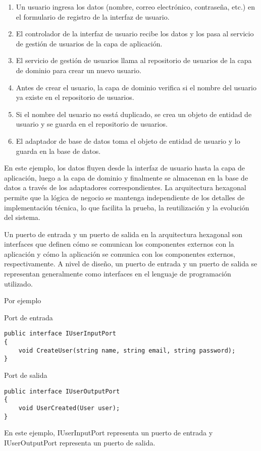 \documentclass[executivepaper]{article}
\begin{document}
\begin{enumerate}
    \item Un usuario ingresa los datos (nombre, correo electrónico, contraseña, etc.) en el formulario de registro de la interfaz de usuario.
    \item El controlador de la interfaz de usuario recibe los datos y los pasa al servicio de gestión de usuarios de la capa de aplicación.
    \item El servicio de gestión de usuarios llama al repositorio de usuarios de la capa de dominio para crear un nuevo usuario.
    \item Antes de crear el usuario, la capa de dominio verifica si el nombre del usuario ya existe en el repositorio de usuarios.
    \item Si el nombre del usuario no esstá duplicado, se crea un objeto de entidad de usuario y se guarda en el repositorio de usuarios.
    \item El adaptador de base de datos toma el objeto de entidad de usuario y lo guarda en la base de datos.
\end{enumerate}
En este ejemplo, los datos fluyen desde la interfaz de usuario hasta la capa de aplicación, luego a la capa de dominio y finalmente se almacenan en la base de datos a través de los adaptadores correspondientes. La arquitectura hexagonal permite que la lógica de negocio se mantenga independiente de los detalles de implementación técnica, lo que facilita la prueba, la reutilización y la evolución del sistema.

Un puerto de entrada y un puerto de salida en la arquitectura hexagonal son interfaces que definen cómo se comunican los componentes externos con la aplicación y cómo la aplicación se comunica con los componentes externos, respectivamente. A nivel de diseño, un puerto de entrada y un puerto de salida se representan generalmente como interfaces en el lenguaje de programación utilizado.

Por ejemplo 

Port de entrada
\begin{lstlisting}
public interface IUserInputPort
{
    void CreateUser(string name, string email, string password);
}
\end{lstlisting}

Port de salida
\begin{lstlisting}
public interface IUserOutputPort
{
    void UserCreated(User user);
}
\end{lstlisting}

En este ejemplo, IUserInputPort representa un puerto de entrada y IUserOutputPort representa un puerto de salida.
\end{document}
